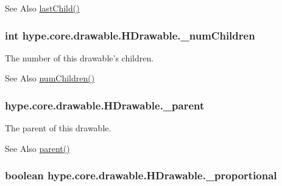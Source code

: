 \begin{DoxySeeAlso}{See Also}
\hyperlink{classhype_1_1core_1_1drawable_1_1_h_drawable_a2fcc779fd97b24ef039c92cbc606717f}{last\-Child()} 
\end{DoxySeeAlso}
\hypertarget{classhype_1_1core_1_1drawable_1_1_h_drawable_a3d2ec798d880968b25a5c81a8dd31357}{
\subsubsection[{\-\_\-num\-Children}]{\setlength{\rightskip}{0pt plus 5cm}int hype.\-core.\-drawable.\-H\-Drawable.\-\_\-num\-Children\hspace{0.3cm}{\ttfamily [protected]}}}\label{classhype_1_1core_1_1drawable_1_1_h_drawable_a3d2ec798d880968b25a5c81a8dd31357}


The number of this drawable's children. 

\begin{DoxySeeAlso}{See Also}
\hyperlink{classhype_1_1core_1_1drawable_1_1_h_drawable_a85a4ab0860a8c22e7f66d3da99f06940}{num\-Children()} 
\end{DoxySeeAlso}
\hypertarget{classhype_1_1core_1_1drawable_1_1_h_drawable_ad612d5e1d96467275eeb8163b9da4b8f}{
\subsubsection[{\-\_\-parent}]{ hype.\-core.\-drawable.\-H\-Drawable.\-\_\-parent\hspace{0.3cm}{\ttfamily [protected]}}}\label{classhype_1_1core_1_1drawable_1_1_h_drawable_ad612d5e1d96467275eeb8163b9da4b8f}


The parent of this drawable. 

\begin{DoxySeeAlso}{See Also}
\hyperlink{classhype_1_1core_1_1drawable_1_1_h_drawable_ae3e39365ae4a4efd3c1540bd428a630c}{parent()} 
\end{DoxySeeAlso}
\hypertarget{classhype_1_1core_1_1drawable_1_1_h_drawable_a1f42fdc1d43de75542c1b581d552dafa}{
\subsubsection[{\-\_\-proportional}]{\setlength{\rightskip}{0pt plus 5cm}boolean hype.\-core.\-drawable.\-H\-Drawable.\-\_\-proportional\hspace{0.3cm}{\ttfamily [protected]}}}\label{classhype_1_1core_1_1drawable_1_1_h_drawable_a1f42fdc1d43de75542c1b581d552dafa}


